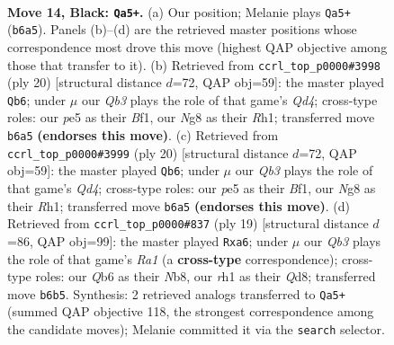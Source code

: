 \documentclass[11pt]{article}
\begin{document}
\begin{figure}[p]
\label{fig:thought-m25}
\end{figure}

\clearpage

\begin{figure}[p]\centering
\begin{subfigure}{0.46\textwidth}\centering
\resizebox{\linewidth}{!}{%
\newchessgame
\chessboard[
  setfen={2kr1bnr/pp1b4/1qn1p1p1/1P1pP1Pp/3P4/P4N2/5P2/RNBQKB1R b KQ - 0 14},
  showmover=false,
  pgfstyle=straightmove, color=movearrow, markmove={b6-a5}
]}
\caption{}
\end{subfigure}\hfill
\begin{subfigure}{0.46\textwidth}\centering
\resizebox{\linewidth}{!}{%
\newchessgame
\chessboard[
  setfen={r1b1kb1r/1pq2ppp/p4n2/3pp3/3QP3/2N1BP2/PPP3PP/2KR1B1R w kq - 0 11},
  showmover=false,
  pgfstyle=straightmove, color=movearrow, markmove={d4-b6}
]}
\caption{}
\end{subfigure}
\\[4pt]
\begin{subfigure}{0.46\textwidth}\centering
\resizebox{\linewidth}{!}{%
\newchessgame
\chessboard[
  setfen={r1b1kb1r/1pq2ppp/p4n2/3pp3/3QP3/2N1BP2/PPP3PP/2KR1B1R w kq - 0 11},
  showmover=false,
  pgfstyle=straightmove, color=movearrow, markmove={d4-b6}
]}
\caption{}
\end{subfigure}\hfill
\begin{subfigure}{0.46\textwidth}\centering
\resizebox{\linewidth}{!}{%
\newchessgame
\chessboard[
  setfen={rn1qkb1r/1bp2ppp/Pn2p3/4P3/2pP4/2N1BN2/1P3PPP/R2QKB1R b KQkq - 0 10},
  showmover=false,
  pgfstyle=straightmove, color=movearrow, markmove={a8-a6}
]}
\caption{}
\end{subfigure}
\caption{\textbf{Move 14, Black: \texttt{Qa5+}.} (a) Our position; Melanie plays \texttt{Qa5+} (\texttt{b6a5}). Panels (b)--(d) are the retrieved master positions whose correspondence most drove this move (highest QAP objective among those that transfer to it). (b) Retrieved from \texttt{ccrl\_top\_p0000\#3998} (ply 20) [structural distance $d$=72, QAP obj=59]: the master played \texttt{Qb6}; under $\mu$ our \emph{Qb3} plays the role of that game's \emph{Qd4}; cross-type roles: our \emph{p}e5 as their \emph{B}f1, our \emph{N}g8 as their \emph{R}h1; transferred move \texttt{b6a5} \textbf{(endorses this move)}. (c) Retrieved from \texttt{ccrl\_top\_p0000\#3999} (ply 20) [structural distance $d$=72, QAP obj=59]: the master played \texttt{Qb6}; under $\mu$ our \emph{Qb3} plays the role of that game's \emph{Qd4}; cross-type roles: our \emph{p}e5 as their \emph{B}f1, our \emph{N}g8 as their \emph{R}h1; transferred move \texttt{b6a5} \textbf{(endorses this move)}. (d) Retrieved from \texttt{ccrl\_top\_p0000\#837} (ply 19) [structural distance $d$=86, QAP obj=99]: the master played \texttt{Rxa6}; under $\mu$ our \emph{Qb3} plays the role of that game's \emph{Ra1} (a \textbf{cross-type} correspondence); cross-type roles: our \emph{Q}b6 as their \emph{N}b8, our \emph{r}h1 as their \emph{Q}d8; transferred move \texttt{b6b5}. Synthesis: 2 retrieved analogs transferred to \texttt{Qa5+} (summed QAP objective 118, the strongest correspondence among the candidate moves); Melanie committed it via the \texttt{search} selector.}

\end{figure}
\end{document}
